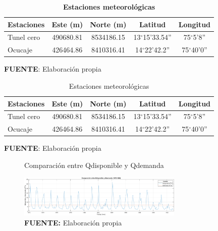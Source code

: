 \begin{table}[H]
\centering
\begin{threeparttable}
\caption[Estaciones meteorológicas]{\textbf{Estaciones meteorológicas}}
\label{tab:my-table}
\begin{tabular}{@{}lcccc@{}}
\hline
Estaciones & Este (m) & Norte (m) & Latitud & Longitud \\ \hline
Tunel cero & 490680.81 & 8534186.15 & 13$^{\circ}$15'33.54'' & 75$^{\circ}$5'8'' \\
Ocucaje & 426464.86 & 8410316.41 & 14$^{\circ}$22'42.2'' & 75$^{\circ}$40'0'' \\ \hline
\end{tabular}
    \begin{tablenotes}
    \vspace{-0.5cm}
      \item {{\fontsize{10pt}{ \baselineskip}\selectfont \textbf{FUENTE}: Elaboración propia}}
    \end{tablenotes}
\end{threeparttable}
\end{table}

\begin{table}[H]
\centering
  \begin{threeparttable}
\caption{Estaciones meteorológicas}
\label{tab:my-table2}
\begin{tabular}{@{}lcccc@{}}
\hline
Estaciones & Este (m) & Norte (m) & Latitud & Longitud \\ \hline
Tunel cero & 490680.81 & 8534186.15 & 13$^{\circ}$15'33.54'' & 75$^{\circ}$5'8'' \\
Ocucaje & 426464.86 & 8410316.41 & 14$^{\circ}$22'42.2'' & 75$^{\circ}$40'0'' \\ \hline
\end{tabular}
    \begin{tablenotes}
    \vspace{-0.5cm}
      \item {{\fontsize{10pt}{ \baselineskip}\selectfont \textbf{FUENTE}: Elaboración propia}}
    \end{tablenotes}
\end{threeparttable}
\end{table}

\begin{figure}[H]
    \centering
      \caption{Comparación entre Qdisponible y Qdemanda}
        \includegraphics[width=0.7\textwidth]{Figures/Comparation.pdf}
        \captionsetup{labelfont=rm,skip=2pt,textfont=rm,font=small}
        \caption*{\textbf{FUENTE:} Elaboración propia}
    \label{fig:12}
\end{figure}


